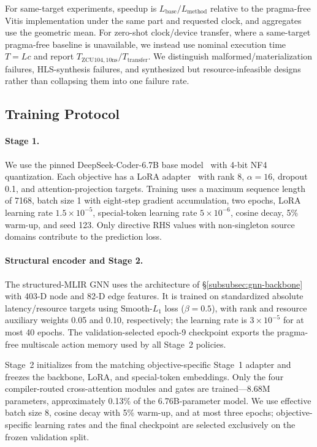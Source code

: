 For same-target experiments, speedup is
$L_{\mathrm{base}}/L_{\mathrm{method}}$ relative to the pragma-free
Vitis implementation under the same part and requested clock, and
aggregates use the geometric mean. For zero-shot clock/device transfer,
where a same-target pragma-free baseline is unavailable, we instead use
nominal execution time $T=Lc$ and report
$T_{\mathrm{ZCU104},10\mathrm{ns}}/T_{\mathrm{transfer}}$.
We distinguish malformed/materialization failures, HLS-synthesis
failures, and synthesized but resource-infeasible designs rather than
collapsing them into one failure rate.


\subsection{Training Protocol}
\label{subsec:eval-training}

\paragraph{Stage 1.}
We use the pinned DeepSeek-Coder-6.7B base model~\cite{guo2024deepseekcoder}
with 4-bit NF4 quantization. Each objective has a LoRA
adapter~\cite{hu2022lora} with rank 8, $\alpha=16$, dropout 0.1,
and attention-projection targets. Training uses a maximum sequence
length of 7168, batch size 1 with eight-step gradient accumulation,
two epochs, LoRA learning rate $1.5\times10^{-5}$, special-token
learning rate $5\times10^{-6}$, cosine decay, 5\% warm-up, and seed 123.
Only directive RHS values with non-singleton source domains contribute
to the prediction loss.

\paragraph{Structural encoder and Stage 2.}
The structured-MLIR GNN uses the architecture of
\S\ref{subsubsec:gnn-backbone} with 403-D node and 82-D edge features.
It is trained on standardized absolute latency/resource targets using
Smooth-$L_1$ loss ($\beta=0.5$), with rank and resource auxiliary
weights 0.05 and 0.10, respectively; the learning rate is
$3\times10^{-5}$ for at most 40 epochs. The validation-selected
epoch-9 checkpoint exports the pragma-free multiscale action memory
used by all Stage~2 policies.

Stage~2 initializes from the matching objective-specific Stage~1
adapter and freezes the backbone, LoRA, and special-token embeddings.
Only the four compiler-routed cross-attention modules and gates are
trained---8.68M parameters, approximately 0.13\% of the 6.76B-parameter
model. We use effective batch size 8, cosine decay with 5\% warm-up,
and at most three epochs; objective-specific learning rates and the
final checkpoint are selected exclusively on the frozen validation
split.

